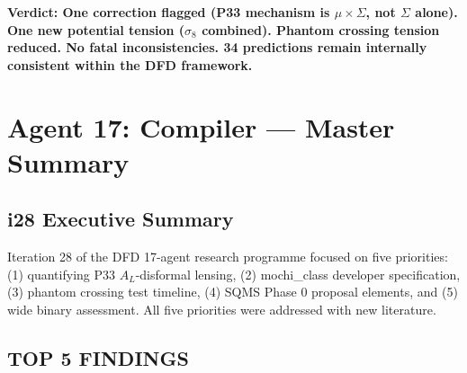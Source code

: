 \documentclass[11pt,a4paper]{article}
\begin{document}
\textbf{Verdict: One correction flagged (P33 mechanism is $\mu \times \Sigma$, not $\Sigma$ alone). One new potential tension ($\sigma_8$ combined). Phantom crossing tension reduced. No fatal inconsistencies. 34 predictions remain internally consistent within the DFD framework.}

\section{Agent 17: Compiler --- Master Summary}

\subsection{i28 Executive Summary}

Iteration 28 of the DFD 17-agent research programme focused on five priorities: (1) quantifying P33 $A_L$-disformal lensing, (2) mochi\_class developer specification, (3) phantom crossing test timeline, (4) SQMS Phase 0 proposal elements, and (5) wide binary assessment. All five priorities were addressed with new literature.

\subsection{TOP 5 FINDINGS}
\end{document}
